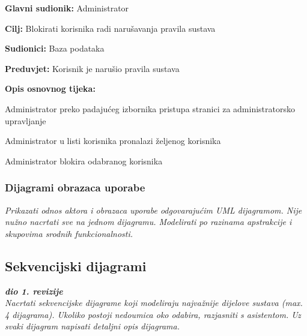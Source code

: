 					\noindent {}
					\begin{packed_item}
						
						\item \textbf{Glavni sudionik: } Administrator
						\item  \textbf{Cilj:} Blokirati korisnika radi narušavanja pravila sustava
						\item  \textbf{Sudionici:} Baza podataka
						\item  \textbf{Preduvjet:} Korisnik je narušio pravila sustava
						\item  \textbf{Opis osnovnog tijeka:}
						
						\item[] \begin{packed_enum}
							
							\item Administrator preko padajućeg izbornika pristupa stranici za administratorsko upravljanje
							\item Administrator u listi korisnika pronalazi željenog korisnika
							\item Administrator blokira odabranog korisnika
							
						\end{packed_enum}
					\end{packed_item}	
								
				\subsubsection{Dijagrami obrazaca uporabe}
					
					\textit{Prikazati odnos aktora i obrazaca uporabe odgovarajućim UML dijagramom. Nije nužno nacrtati sve na jednom dijagramu. Modelirati po razinama apstrakcije i skupovima srodnih funkcionalnosti.}
				\eject		
				
			\subsection{Sekvencijski dijagrami}
				
				\textbf{\textit{dio 1. revizije}}\\
				
				\textit{Nacrtati sekvencijske dijagrame koji modeliraju najvažnije dijelove sustava (max. 4 dijagrama). Ukoliko postoji nedoumica oko odabira, razjasniti s asistentom. Uz svaki dijagram napisati detaljni opis dijagrama.}
				\eject
	
